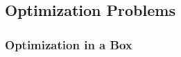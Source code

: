 \documentclass[11pt, a4paper]{article}
\theoremstyle{definition}
\newcommand{\w}{\mathbf{w}}
\newcommand{\hr}{\widehat \rho}
\begin{document}
\subsection{Optimization Problems}
\subsubsection{Optimization in a Box}
%
%
\end{document}
